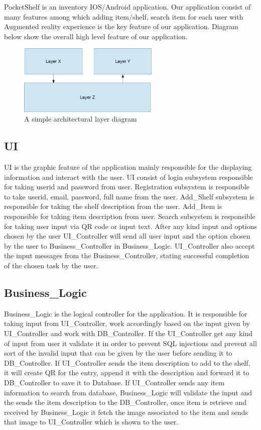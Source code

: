 PocketShelf is an inventory IOS/Android application. Our application consist of many features among which adding item/shelf, search item for each user with Augmented reality experience is the key feature of our application. Diagram below show the overall high level feature of our application.


\begin{figure}[h!]
	\centering
 	\includegraphics[width=0.60\textwidth]{images/layers}
 \caption{A simple architectural layer diagram}
\end{figure}

\subsection{UI}
UI is the graphic feature of the application mainly responsible for the displaying information and interact with the user. UI consist of login subsystem responsible for taking userid and password from user. Registration subsystem is responsible to take userid, email, password, full name from the user. Add\_Shelf subsystem is responsible for taking the shelf description from the user. Add\_Item is responsible for taking item description from user. Search subsystem is responsible for taking user input via QR code or input text. After any kind input and options chosen by the user UI\_Controller will send all user input and the option chosen by the user to Business\_Controller in Business\_Logic. UI\_Controller also accept the input messages from the Business\_Controller, stating successful completion of the chosen task by the user.

\subsection{Business\_Logic}
Business\_Logic is the logical controller for the application. It is responsible for taking input from UI\_Controller, work accordingly based on the input given by UI\_Controller and work with DB\_Controller. If the UI\_Controller get any kind of input from user it validate it in order to prevent SQL injections and prevent all sort of the invalid input that can be given by the user before sending it to DB\_Controller. If UI\_Controller sends the item description to add to the shelf, it will create QR for the entry, append it with the description and forward it to DB\_Controller to save it to Database. If UI\_Controller sends any item information to search from database, Business\_Logic will validate the input and the sends the item description to the DB\_Controller, once item is retrieve and received by Business\_Logic it fetch the image associated to the item and sends that image to UI\_Controller which is shown to the user.


